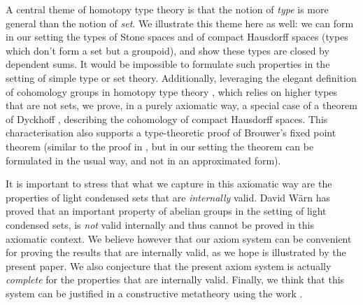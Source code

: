 A central theme of homotopy type theory is that the notion of {\em type} is more general than the notion of {\em set}. We illustrate
this theme here as well: we can form in our setting the types of Stone spaces and of compact Hausdorff spaces
(types which don't form a set but a groupoid),
and show these types are
closed by dependent sums. It would be impossible to formulate such properties in the setting of simple type or set theory.
Additionally, leveraging the elegant definition of cohomology groups in homotopy type theory \cite{hott}, which relies
on higher types that are not sets, we prove, in a purely axiomatic way,
a special case of a theorem of Dyckhoff \cite{dyckhoff76}, describing
the cohomology of compact Hausdorff spaces. This characterisation also supports a type-theoretic proof of
Brouwer's fixed point theorem
(similar to the proof in \cite{shulman-Brouwer-fixed-point}, but
in our setting the theorem can be formulated in the usual
way, and not in an approximated form).

It is important to stress that what we capture in this axiomatic way are the properties of light condensed
sets that are {\em internally} valid. David W\"arn \cite{warn2024} has proved that an important property of abelian
groups in the setting of light condensed sets, is {\em not} valid internally and thus cannot be proved in this axiomatic context.
We believe however that our axiom system can be convenient for proving the results that are internally valid, as we hope
is illustrated by the present paper. We also conjecture that the present axiom system is actually {\em complete}
for the properties that are internally valid. Finally, we think that this system can be justified in a constructive metatheory
using the work \cite{CRS21}.
